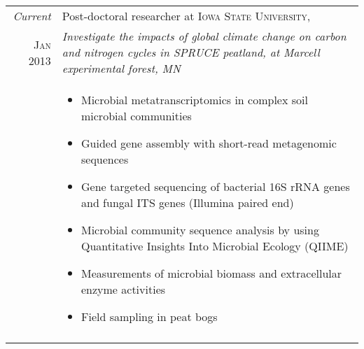 \documentclass[letterpaper,10pt]{article} %
\begin{document}
\begin{tabular}{r|p{13cm}}
\emph{Current} & Post-doctoral researcher at \textsc{Iowa State University},\\
\textsc{Jan 2013} & \emph{Investigate the impacts of global climate change on carbon and nitrogen cycles in SPRUCE peatland, at Marcell experimental forest, MN}\\ 
& \footnotesize{
\begin{itemize}
    \item Microbial metatranscriptomics in complex soil microbial communities
    \item Guided gene assembly with short-read metagenomic sequences 
    \item Gene targeted sequencing of bacterial 16S rRNA genes and fungal ITS genes (Illumina paired end)
    \item Microbial community sequence analysis by using Quantitative Insights Into Microbial Ecology (QIIME)
    \item Measurements of microbial biomass and extracellular enzyme activities
    \item Field sampling in peat bogs
\end{itemize}
}\\
\multicolumn{2}{c}{} \\



\end{tabular}
\end{document}
